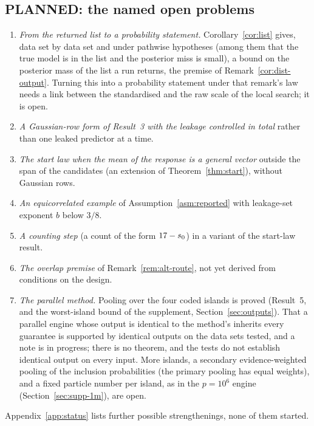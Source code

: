 \subsection{PLANNED: the named open problems}\label{sec:plan-open}


\begin{enumerate}[leftmargin=1.6em,itemsep=1pt]
  \item \emph{From the returned list to a probability statement.} Corollary~\ref{cor:list} gives, data set by data set
    and under pathwise hypotheses (among them that the true model is in the list and the posterior miss is small), a bound
    on the posterior mass of the list a run returns, the premise of Remark~\ref{cor:dist-output}. Turning this into a
    probability statement under that remark's law needs a link between the standardised and the raw scale of the local
    search; it is open.
  \item \emph{A Gaussian-row form of Result~3 with the leakage controlled in total} rather than one leaked predictor at a
    time.
  \item \emph{The start law when the mean of the response is a general vector} outside the span of the candidates
    (an extension of Theorem~\ref{thm:start}), without Gaussian rows.
  \item \emph{An equicorrelated example} of Assumption~\ref{asm:reported} with leakage-set exponent $b$ below $3/8$.
  \item \emph{A counting step} (a count of the form $17-s_0$) in a variant of the start-law result.
  \item \emph{The overlap premise} of Remark~\ref{rem:alt-route}, not yet derived from conditions on the design.
  \item \emph{The parallel method.} Pooling over the four coded islands is proved (Result~5, and the worst-island bound of the supplement, Section~\ref{sec:outputs}).
    That a parallel engine whose output is identical to the method's inherits every guarantee is supported by identical
    outputs on the data sets tested, and a note is in progress; there is no theorem, and the tests do not establish
    identical output on every input. More islands, a secondary evidence-weighted pooling of the inclusion probabilities
    (the primary pooling has equal weights), and a fixed particle number per island, as in the $p=10^6$ engine (Section~\ref{sec:supp-1m}), are open.
\end{enumerate}
Appendix~\ref{app:status} lists further possible strengthenings, none of them started.
